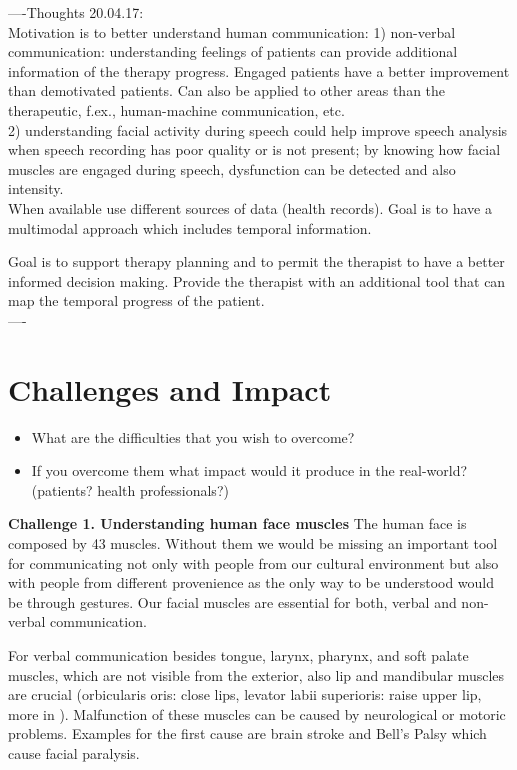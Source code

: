 ----Thoughts 20.04.17:\\
Motivation is to better understand human communication: 1) non-verbal communication: understanding feelings of patients can provide additional information of the therapy progress. Engaged patients have a better improvement than demotivated patients. Can also be applied to other areas than the therapeutic, f.ex., human-machine communication, etc. \\
2) understanding facial activity during speech could help improve speech analysis when speech recording has poor quality or is not present; by knowing how facial muscles are engaged during speech, dysfunction can be detected and also intensity.\\
When available use different sources of data (health records). Goal is to have a multimodal approach which includes temporal information. 

Goal is to support therapy planning and to permit the therapist to have a better informed decision making. Provide the therapist with an additional tool that can map the temporal progress of the patient. \\ 
----\\

\section{Challenges and Impact}

\begin{itemize}
    \item What are the difficulties that you wish to overcome?
    \item If you overcome them what impact would it produce in the real-world? (patients? health professionals?)
\end{itemize}

\textbf{Challenge 1. Understanding human face muscles}
The human face is composed by 43 muscles. Without them we would be missing an important tool for communicating not only with people from our cultural environment but also with people from different provenience as the only way to be understood would be through gestures. Our facial muscles are essential for both, verbal and non-verbal communication.\par 
For verbal communication besides tongue, larynx, pharynx, and soft palate muscles, which are not visible from the exterior, also lip and mandibular muscles are crucial (orbicularis oris: close lips, levator labii superioris: raise upper lip, more in \cite{PhonManual}). 
Malfunction of these muscles can be caused by neurological or motoric problems. Examples for the first cause are brain stroke and Bell's Palsy which cause facial paralysis.

